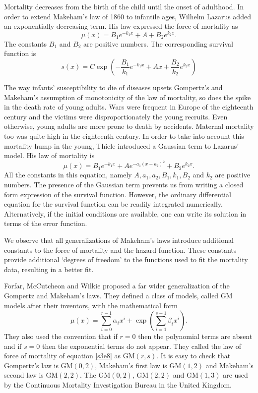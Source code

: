 \documentclass{article}
\numberwithin{equation}{section}
\begin{document}
Mortality decreases from the birth of the child until the onset of adulthood. 
In order to extend Makeham's law of 1860 to infantile ages, Wilhelm Lazarus 
\cite{lazarus1867ueber} added an exponentially decreasing term. His law 
expressed the force of mortality as 
\begin{equation}\label{s3e5}
\mu(x) = B_1 e^{-k_1x} + A + B_2e^{k_2 x}.
\end{equation}
The constants $B_1$ and $B_2$ are positive numbers. The corresponding survival 
function is
\begin{equation}\label{s3e6}
s(x) = 
C\exp\left(-\frac{B_1}{k_1}e^{-k_1x} + Ax + \frac{B_2}{k_2}e^{k_2x}\right)
\end{equation}

The way infants' susceptibility to die of diseases upsets Gompertz's and 
Makeham's assumption of monotonicity of the law of mortality, so does the 
spike in the death rate of young adults. Wars were frequent in Europe of the 
eighteenth century and the victims were disproportionately the young recruits.
Even otherwise, young adults are more prone to death by accidents. Maternal
mortality too was quite high in the eighteenth century. In order
to take into account this mortality hump in the young, Thiele 
\cite{thiele1871mathematical} introduced a Gaussian term to Lazarus' model.
His law of mortality is
\begin{equation}\label{s3e7}
\mu(x) = B_1 e^{-k_1x} + Ae^{-a_1(x - a_2)^2} + B_2e^{k_2 x}.
\end{equation}
All the constants in this equation, namely $A, a_1, a_2, B_1, k_1, B_2$ and 
$k_2$ are positive numbers. The presence of the Gaussian term prevents us
from writing a closed form expression of the survival function. However, the
ordinary differential equation for the survival function can be readily 
integrated numerically. Alternatively, if the initial conditions are available,
one can write its solution in terms of the error function.

We observe that all generalizations of Makeham's laws introduce additional
constants to the force of mortality and the hazard function. These constants
provide additional `degrees of freedom' to the functions used to fit the 
mortality data, resulting in a better fit.

Forfar, McCutcheon and Wilkie \cite{forfar1988graduation} proposed a far wider 
generalization of the Gompertz and Makeham's laws. They defined a class of 
models, called GM models after their inventors, with the mathematical form
\begin{equation}\label{s3e8}
\mu(x) = \sum_{i=0}^{r-1}\alpha_i x^i + 
\exp\left(\sum_{i=1}^{s-1}\beta_i x^i\right).
\end{equation}
They also used the convention that if $r = 0$ then the polynomial terms are 
absent and if $s = 0$ then the exponential terms do not appear. They called
the law of force of mortality of equation \eqref{s3e8} as $\mathrm{GM}(r,s)$.
It is easy to check that Gompertz's law is $\mathrm{GM}(0, 2)$, Makeham's
first law is $\mathrm{GM}(1,2)$ and Makeham's second law is $\mathrm{GM}(2,2)$.
The $\mathrm{GM}(0, 2)$, $\mathrm{GM}(2,2)$ and $\mathrm{GM}(1,3)$ are used
by the Continuous Mortality Investigation Bureau\cite{pitacco2016high} in the 
United Kingdom.
\end{document}
